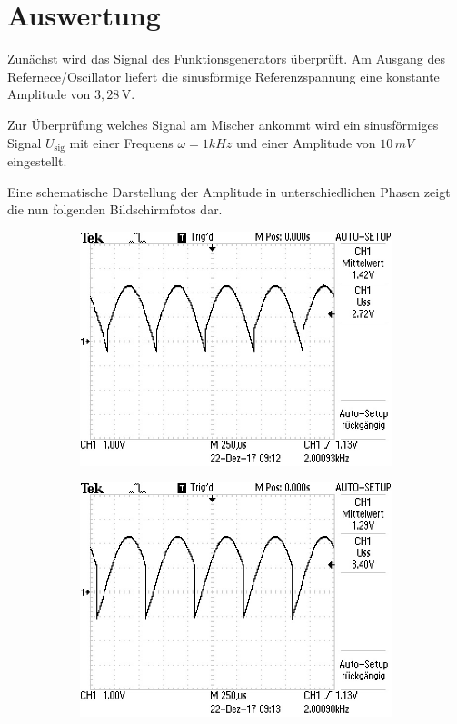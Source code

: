 \section{Auswertung}
Zunächst wird das Signal des Funktionsgenerators überprüft. Am Ausgang des Refernece/Oscillator liefert
die sinusförmige Referenzspannung eine konstante Amplitude von $3,28 \, \si{\volt}$.

Zur Überprüfung welches Signal am Mischer ankommt wird ein sinusförmiges Signal $U_\text{sig}$ mit
einer Frequens $\omega = 1 kHz$ und einer Amplitude von $10 \, mV$ eingestellt.

Eine schematische Darstellung der Amplitude in unterschiedlichen Phasen zeigt die nun folgenden
Bildschirmfotos dar.
\begin{figure}[H]
\centering
\begin{subfigure}{0.48\textwidth}
	\includegraphics[width=\textwidth]{0Grad.JPG}
\end{subfigure}
\begin{subfigure}{0.48\textwidth}
  \includegraphics[width=\textwidth]{45Grad.JPG}

\end{subfigure}
\end{figure}
